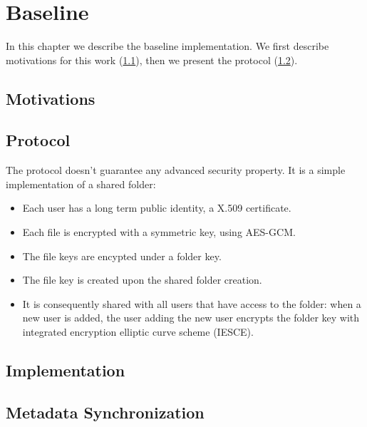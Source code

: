 \chapter{Baseline}\label{ch:baseline}

In this chapter we describe the baseline implementation.
We first describe motivations for this work (\cref{sc:baseline-motivations}),
then we present the protocol (\cref{sc:baseline-protocol}).

\section{Motivations}\label{sc:baseline-motivations}

\section{Protocol}\label{sc:baseline-protocol}

The protocol doesn't guarantee any advanced security property.
It is a simple implementation of a shared folder:
\begin{itemize}
    \item Each user has a long term public identity, a X.509 certificate.
    \item Each file is encrypted with a symmetric key, using AES-GCM.
    \item The file keys are encypted under a folder key.
    \item The file key is created upon the shared folder creation.
    \item It is consequently shared with all users that have access to the folder: when a new user is added, the user adding the new user encrypts the folder key with integrated encryption elliptic curve scheme (IESCE).
\end{itemize}

\section{Implementation}

\section{Metadata Synchronization}\label{sc:metadata-synchronization}
